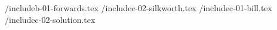 
/include{b-01-forwards.tex}
/include{c-02-silkworth.tex}
/include{c-01-bill.tex}
/include{c-02-solution.tex}

